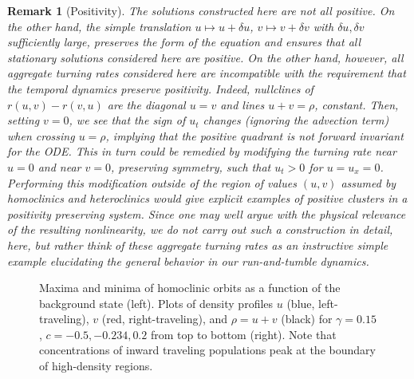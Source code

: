 \documentclass[10pt]{article}
\newtheorem{Remark}[Lemma]{Remark}
\begin{document}
\begin{Remark}[Positivity]
 The solutions constructed here are not all positive. On the other hand, the simple translation $u\mapsto u+\delta u$, $v\mapsto v+\delta v$ with $\delta u,\delta v$ sufficiently large, preserves the form of the equation and ensures that all stationary solutions considered here are positive. On the other hand, however, all aggregate turning rates considered here are incompatible with the requirement that the temporal dynamics preserve positivity. Indeed, nullclines of $r(u,v)-r(v,u)$ are the diagonal $u=v$ and lines $u+v=\rho$, constant. Then, setting $v=0$, we see that the sign of $u_t$ changes (ignoring the advection term) when crossing $u=\rho$, implying that the positive quadrant is not forward invariant for the ODE. This in turn could be remedied by modifying the turning rate near $u=0$ and near $v=0$, preserving symmetry, such that $u_t>0$ for $u=u_x=0$. Performing this modification outside of the region of values $(u,v)$ assumed by homoclinics and heteroclinics would give explicit examples of positive clusters in a positivity preserving system. Since one may well argue with the physical relevance of the resulting nonlinearity, we do not carry out such a construction in detail, here, but rather think of these aggregate turning rates as an instructive simple example elucidating the general behavior in our run-and-tumble dynamics. 
 \end{Remark}
\begin{figure}[H] 
\caption{Maxima and minima of homoclinic orbits as a function of the background state (left). Plots of density profiles $u$ (blue, left-traveling), $v$ (red, right-traveling), and $\rho=u+v$ (black) for $\gamma=0.15$, $c=-0.5,-0.234,0.2$ from top to bottom (right). Note that concentrations of inward traveling populations peak at the boundary of high-density regions.}
\label{rhomax}
\end{figure} 

% 
% 
% 
\end{document}
